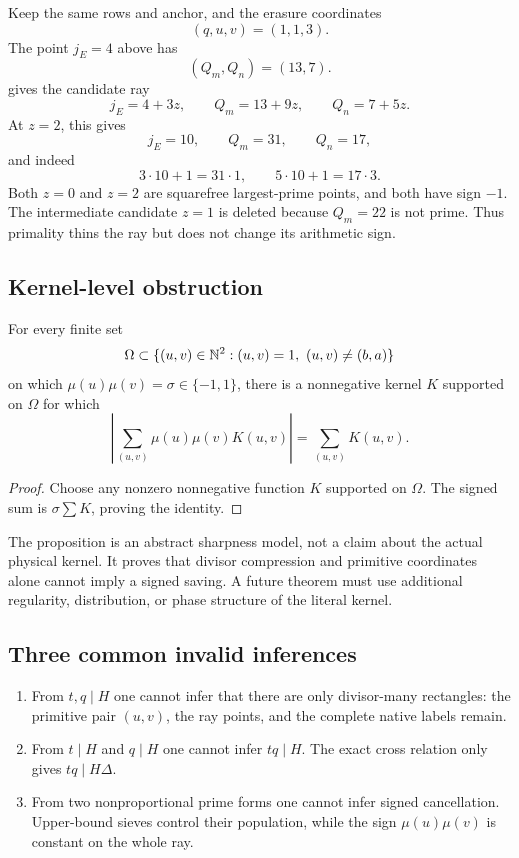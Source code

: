 \begin{example}
\label{ex:frozen-ray-two-points}
Keep the same rows and anchor, and the erasure coordinates
\[
 (q,u,v)=(1,1,3).
\]
The point \(j_E=4\) above has
\[
 (Q_m,Q_n)=(13,7).
\]
 gives the candidate ray
\[
 j_E=4+3z,\qquad Q_m=13+9z,\qquad Q_n=7+5z.
\]
At \(z=2\), this gives
\[
 j_E=10,\qquad Q_m=31,\qquad Q_n=17,
\]
and indeed
\[
 3\cdot10+1=31\cdot1,\qquad
 5\cdot10+1=17\cdot3.
\]
Both \(z=0\) and \(z=2\) are squarefree largest-prime points, and both
have sign \(-1\).  The intermediate candidate \(z=1\) is deleted because
\(Q_m=22\) is not prime.  Thus primality thins the ray but does not change
its arithmetic sign.
\end{example}

\subsection{Kernel-level obstruction}

\begin{proposition}
\label{prop:kernel-level-no-go}
For every finite set
\[
 \Omega\subset
 \{(u,v)\in\mathbb N^2:(u,v)=1,\ (u,v)\ne(b,a)\}
\]
on which \(\mu(u)\mu(v)=\sigma\in\{-1,1\}\), there is a nonnegative kernel
\(K\) supported on \(\Omega\) for which
\begin{equation}
 \left|
 \sum_{(u,v)}\mu(u)\mu(v)K(u,v)
 \right|
 =
 \sum_{(u,v)}K(u,v).
 \label{eq:kernel-no-cancellation}
\end{equation}
\end{proposition}

\begin{proof}
Choose any nonzero nonnegative function \(K\) supported on \(\Omega\).
The signed sum is \(\sigma\sum K\), proving the identity.
\end{proof}

The proposition is an abstract sharpness model, not a claim about the
actual physical kernel.  It proves that divisor compression and primitive
coordinates alone cannot imply a signed saving.  A future theorem must use
additional regularity, distribution, or phase structure of the literal
kernel.

\subsection{Three common invalid inferences}

\begin{enumerate}[label=\textup{(\arabic*)},leftmargin=3em]
 \item From \(t,q\mid H\) one cannot infer that there are only
       divisor-many rectangles: the primitive pair \((u,v)\), the ray
       points, and the complete native labels remain.
 \item From \(t\mid H\) and \(q\mid H\) one cannot infer \(tq\mid H\).
       The exact cross relation only gives \(tq\mid H\Delta\).
 \item From two nonproportional prime forms one cannot infer signed
       cancellation.  Upper-bound sieves control their population, while
       the sign \(\mu(u)\mu(v)\) is constant on the whole ray.
\end{enumerate}
